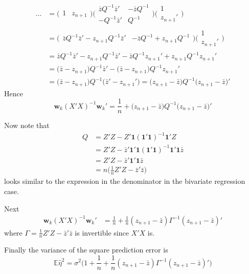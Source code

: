 \documentclass[a4paper]{article}
\newcommand{\w}{\mathbf{w}}
\newcommand{\e}{\mathbf{1}}
\newcommand{\Ex}{\mathbb{E}}
\begin{document}
\begin{align*}
	\ldots
	&= \big( \begin{matrix} 1 & z_{n+1} \end{matrix} \big) \bigg(\begin{matrix} \bar{z} Q^{-1} \bar{z}' & - \bar{z} Q^{-1} \\ - Q^{-1} \bar{z}' & Q^{-1} \end{matrix}\bigg) \bigg(\begin{matrix}1 \\ z_{n+1}'\end{matrix}\bigg)\\
	& =  \big( \begin{matrix} \bar{z} Q^{-1} \bar{z}' - z_{n+1} Q^{-1} \bar{z}' & - \bar{z} Q^{-1} + z_{n+1} Q^{-1} \end{matrix} \big) \bigg(\begin{matrix}1 \\ z_{n+1}'\end{matrix}\bigg)\\
	&= \bar{z} Q^{-1} \bar{z}' - z_{n+1} Q^{-1} \bar{z}' - \bar{z} Q^{-1} z_{n+1}' + z_{n+1} Q^{-1} z_{n+1}'\\
	&= \big(\bar{z} - z_{n+1}\big)Q^{-1} \bar{z}' - \big(\bar{z} - z_{n+1}\big)Q^{-1} z_{n+1}'\\
	&= \big(\bar{z} - z_{n+1}\big)Q^{-1} \big(\bar{z}' - z_{n+1}'\big) = \big(z_{n+1} - \bar{z}\big)Q^{-1} \big(z_{n+1} - \bar{z}\big)'
\end{align*}
Hence
\[\w_k (X'X)^{-1} \w_k' = \frac{1}{n} + \big(z_{n+1} - \bar{z}\big)Q^{-1} \big(z_{n+1} - \bar{z}\big)'\]

Now note that
\begin{align*}
	Q
	&= Z'Z - Z'\e (\e'\e)^{-1}\e'Z \\
	&= Z'Z - \bar{z}'\e'\e (\e'\e)^{-1}\e'\e \bar{z} \\
	&= Z'Z - \bar{z}'\e'\e \bar{z} \\
	&= n \big( \frac{1}{n} Z'Z - \bar{z}'\bar{z} \big )
\end{align*}
looks similar to the expression in the denominator in the bivariate regression
case.

Next
\begin{align*}
	\w_k (X'X)^{-1} \w_k' & = \frac{1}{n} + \frac{1}{n} (z_{n+1} - \bar{z})\Gamma^{-1} (z_{n+1} - \bar{z})'
\end{align*}
where $\Gamma = \frac{1}{n} Z'Z - \bar{z}' \bar{z}$ is invertible since
$X'X$ is.

Finally the variance of the square prediction error is 
\[ \Ex \hat{\eta}^2 = \sigma^2\big( 1 + \frac{1}{n} + \frac{1}{n} (z_{n+1} - \bar{z})\Gamma^{-1} (z_{n+1} - \bar{z})' \big) \]
\end{document}
